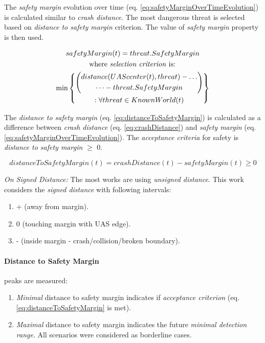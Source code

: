The \emph{safety margin} evolution over time (eq. \ref{eq:safetyMarginOverTimeEvolution}) is calculated similar to \emph{crash distance}. The most dangerous threat is selected based on \emph{distance to safety margin} criterion. The value of \emph{safety margin} property is then used.

\begin{multline}\label{eq:safetyMarginOverTimeEvolution}
    safety Margin(t) =  threat.SafetyMargin\\\text{  where \emph{selection criterion} is:  }\\ \min \left\{\begin{gathered}\left( \begin{gathered} distance(UAScenter(t),threat)-\dots\\\dots-threat.SafetyMargin\end{gathered}\right)\\:\forall threat \in KnownWorld (t)\end{gathered}\right\}
\end{multline}

The \emph{distance to safety margin} (eq. \ref{eq:distanceToSafetyMargin}) is calculated as a difference between \emph{crash distance} (eq. \ref{eq:crashDistance}) and \emph{safety margin} (eq. \ref{eq:safetyMarginOverTimeEvolution}). The \emph{acceptance criteria} for safety is \emph{distance to safety margin} $\ge$ 0.

\begin{equation}\label{eq:distanceToSafetyMargin}
    distanceToSafetyMargin(t) =  crashDistance(t) - safetyMargin(t) \ge 0
\end{equation}

\begin{note}
\emph{On Signed Distance:} The most works are using \emph{unsigned distance}. This work considers the \emph{signed distance} with following intervals:
\begin{enumerate}
	\item + (away from margin).
	\item 0 (touching margin with UAS edge).
	\item - (inside margin - crash/collision/broken boundary).
\end{enumerate}
\end{note}

\paragraph{Distance to Safety Margin} peaks are measured:
\begin{enumerate}
    \item \emph{Minimal} distance to safety margin indicates if \emph{acceptance criterion} (eq. \ref{eq:distanceToSafetyMargin} is met).
    \item \emph{Maximal} distance to safety margin indicates the future \emph{minimal detection range}. All scenarios were considered as borderline cases.
\end{enumerate}

